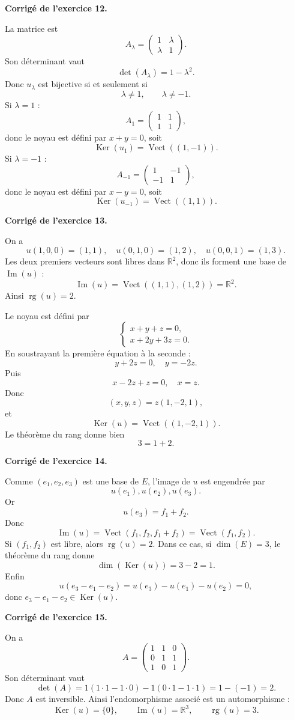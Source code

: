 \documentclass[11pt,a4paper]{article}
\newcommand{\corr}[1]{
    \vspace{0.35cm}
    \noindent\textbf{\textcolor{blue!60!black}{Corrigé de l'exercice #1.}}
    \par
}
\newcommand{\Ker}{\operatorname{Ker}}
\newcommand{\Img}{\operatorname{Im}}
\newcommand{\rg}{\operatorname{rg}}
\newcommand{\Vect}{\operatorname{Vect}}
\begin{document}
\corr{12}
La matrice est
\[
A_\lambda=
\begin{pmatrix}
1&\lambda\\
\lambda&1
\end{pmatrix}.
\]
Son déterminant vaut
\[
\det(A_\lambda)=1-\lambda^2.
\]
Donc $u_\lambda$ est bijective si et seulement si
\[
\lambda\neq 1,\qquad \lambda\neq -1.
\]
Si $\lambda=1$ :
\[
A_1=
\begin{pmatrix}
1&1\\
1&1
\end{pmatrix},
\]
donc le noyau est défini par $x+y=0$, soit
\[
\Ker(u_1)=\Vect((1,-1)).
\]
Si $\lambda=-1$ :
\[
A_{-1}=
\begin{pmatrix}
1&-1\\
-1&1
\end{pmatrix},
\]
donc le noyau est défini par $x-y=0$, soit
\[
\Ker(u_{-1})=\Vect((1,1)).
\]

\corr{13}
On a
\[
u(1,0,0)=(1,1),\quad u(0,1,0)=(1,2),\quad u(0,0,1)=(1,3).
\]
Les deux premiers vecteurs sont libres dans $\mathbb{R}^2$, donc ils forment une base de $\Img(u)$ :
\[
\Img(u)=\Vect((1,1),(1,2))=\mathbb{R}^2.
\]
Ainsi $\rg(u)=2$.

Le noyau est défini par
\[
\begin{cases}
x+y+z=0,\\
x+2y+3z=0.
\end{cases}
\]
En soustrayant la première équation à la seconde :
\[
y+2z=0,\quad y=-2z.
\]
Puis
\[
x-2z+z=0,\quad x=z.
\]
Donc
\[
(x,y,z)=z(1,-2,1),
\]
et
\[
\Ker(u)=\Vect((1,-2,1)).
\]
Le théorème du rang donne bien
\[
3=1+2.
\]

\corr{14}
Comme $(e_1,e_2,e_3)$ est une base de $E$, l'image de $u$ est engendrée par
\[
u(e_1),u(e_2),u(e_3).
\]
Or
\[
u(e_3)=f_1+f_2.
\]
Donc
\[
\Img(u)=\Vect(f_1,f_2,f_1+f_2)=\Vect(f_1,f_2).
\]
Si $(f_1,f_2)$ est libre, alors $\rg(u)=2$. Dans ce cas, si $\dim(E)=3$, le théorème du rang donne
\[
\dim(\Ker(u))=3-2=1.
\]
Enfin
\[
u(e_3-e_1-e_2)=u(e_3)-u(e_1)-u(e_2)=0,
\]
donc $e_3-e_1-e_2\in\Ker(u)$.

\corr{15}
On a
\[
A=
\begin{pmatrix}
1&1&0\\
0&1&1\\
1&0&1
\end{pmatrix}.
\]
Son déterminant vaut
\[
\det(A)=1(1\cdot 1-1\cdot 0)-1(0\cdot 1-1\cdot 1)=1-(-1)=2.
\]
Donc $A$ est inversible. Ainsi l'endomorphisme associé est un automorphisme :
\[
\Ker(u)=\{0\},\qquad \Img(u)=\mathbb{R}^3,\qquad \rg(u)=3.
\]
\end{document}

